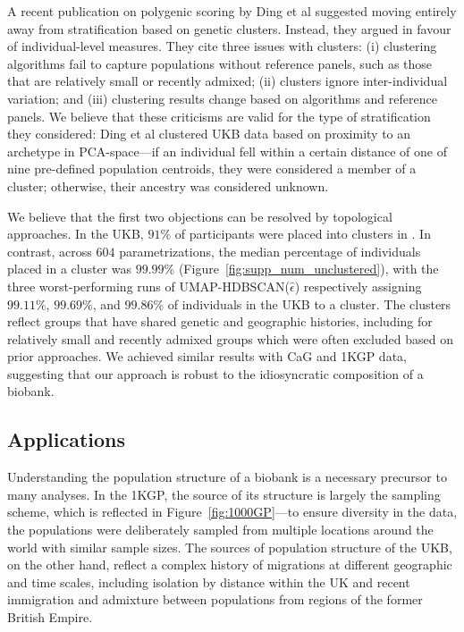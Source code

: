 A recent publication on polygenic scoring by Ding et al\citep{ding_polygenic_2023} suggested moving entirely away from stratification based on genetic clusters. Instead, they argued in favour of individual-level measures. They cite three issues with clusters: (i) clustering algorithms fail to capture populations without reference panels, such as those that are relatively small or recently admixed; (ii) clusters ignore inter-individual variation; and (iii) clustering results change based on algorithms and reference panels. We believe that these criticisms are valid for the type of stratification they considered: Ding et al clustered UKB data based on proximity to an archetype in PCA-space---if an individual fell within a certain distance of one of nine pre-defined population centroids, they were considered a member of a cluster; otherwise, their ancestry was considered unknown.

We believe that the first two objections can be resolved by topological approaches. In the UKB, $91\%$ of participants were placed into clusters in \citep{ding_polygenic_2023}. In contrast, across $604$ parametrizations, the median percentage of individuals placed in a cluster was $99.99\%$ (Figure~\ref{fig:supp_num_unclustered}), with the three worst-performing runs of UMAP-HDBSCAN($\hat{\epsilon}$) respectively assigning $99.11\%$, $99.69\%$, and $99.86\%$  of individuals in the UKB to a cluster. The clusters reflect groups that have shared genetic and geographic histories, including for relatively small and recently admixed groups which were often excluded based on prior approaches\citep{ding_polygenic_2023,martschenko_including_2023}. 
We achieved similar results with CaG and 1KGP data, suggesting that our approach is robust to the idiosyncratic composition of a biobank.  

\subsection{Applications}

Understanding the population structure of a biobank is a necessary precursor to many analyses. In the 1KGP, the source of its structure is largely the sampling scheme, which is reflected in Figure~\ref{fig:1000GP}---to ensure diversity in the data, the populations were deliberately sampled from multiple locations around the world with similar sample sizes. The sources of population structure of the UKB, on the other hand, reflect a complex history of migrations at different geographic and time scales, including isolation by distance within the UK and recent immigration and admixture between populations from regions of the former British Empire.

